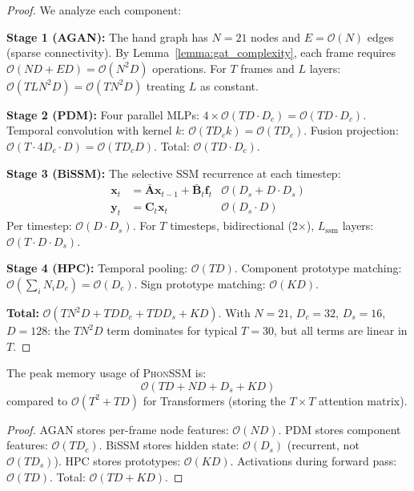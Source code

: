 \documentclass{article}
\newcommand{\phonssm}{\textsc{PhonSSM}}
\begin{document}
\begin{proof}
We analyze each component:

\textbf{Stage 1 (AGAN):} The hand graph has $N=21$ nodes and $E = \mathcal{O}(N)$ edges (sparse connectivity). By Lemma~\ref{lemma:gat_complexity}, each frame requires $\mathcal{O}(ND + ED) = \mathcal{O}(N^2 D)$ operations. For $T$ frames and $L$ layers: $\mathcal{O}(TLN^2D) = \mathcal{O}(TN^2D)$ treating $L$ as constant.

\textbf{Stage 2 (PDM):} Four parallel MLPs: $4 \times \mathcal{O}(TD \cdot D_c) = \mathcal{O}(TD \cdot D_c)$. Temporal convolution with kernel $k$: $\mathcal{O}(T D_c k) = \mathcal{O}(TD_c)$. Fusion projection: $\mathcal{O}(T \cdot 4D_c \cdot D) = \mathcal{O}(TD_c D)$. Total: $\mathcal{O}(TD \cdot D_c)$.

\textbf{Stage 3 (BiSSM):} The selective SSM recurrence at each timestep:
\begin{align}
\mathbf{x}_t &= \bar{\mathbf{A}} \mathbf{x}_{t-1} + \bar{\mathbf{B}}_t \mathbf{f}_t & \mathcal{O}(D_s + D \cdot D_s) \\
\mathbf{y}_t &= \mathbf{C}_t \mathbf{x}_t & \mathcal{O}(D_s \cdot D)
\end{align}
Per timestep: $\mathcal{O}(D \cdot D_s)$. For $T$ timesteps, bidirectional (2$\times$), $L_{\text{ssm}}$ layers: $\mathcal{O}(T \cdot D \cdot D_s)$.

\textbf{Stage 4 (HPC):} Temporal pooling: $\mathcal{O}(TD)$. Component prototype matching: $\mathcal{O}(\sum_i N_i D_c) = \mathcal{O}(D_c)$. Sign prototype matching: $\mathcal{O}(KD)$.

\textbf{Total:} $\mathcal{O}(TN^2D + TD D_c + TD D_s + KD)$. With $N=21$, $D_c=32$, $D_s=16$, $D=128$: the $TN^2D$ term dominates for typical $T=30$, but all terms are linear in $T$.
\end{proof}

\begin{corollary}
\label{cor:memory}
The peak memory usage of \phonssm{} is:
\begin{equation}
\mathcal{O}(TD + ND + D_s + KD)
\end{equation}
compared to $\mathcal{O}(T^2 + TD)$ for Transformers (storing the $T \times T$ attention matrix).
\end{corollary}

\begin{proof}
AGAN stores per-frame node features: $\mathcal{O}(ND)$. PDM stores component features: $\mathcal{O}(T D_c)$. BiSSM stores hidden state: $\mathcal{O}(D_s)$ (recurrent, not $\mathcal{O}(TD_s)$). HPC stores prototypes: $\mathcal{O}(KD)$. Activations during forward pass: $\mathcal{O}(TD)$. Total: $\mathcal{O}(TD + KD)$.
\end{proof}
\end{document}

